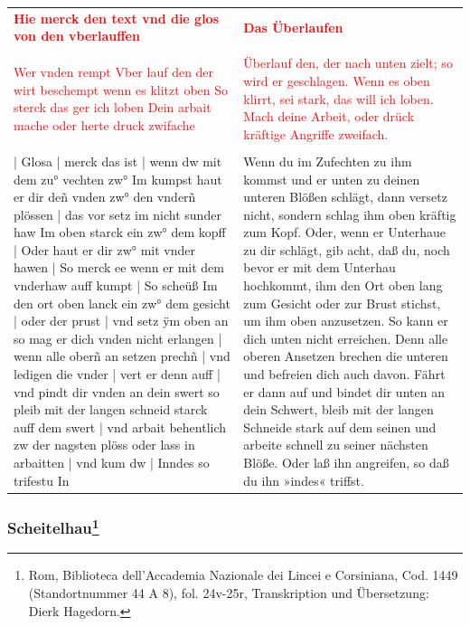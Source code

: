 \begin{longtable}{p{6.25cm}p{6.25cm}}
\textbf{\textcolor{red}{Hie merck den text vnd die glos von den vberlauffen}}
&
\textbf{\textcolor{red}{Das Überlaufen}}
\\
\\
\textcolor{red}{Wer vnden rempt Vber lauf den der wirt beschempt wenn es klitzt oben So sterck das ger ich loben Dein arbait mache oder herte druck zwifache}
&
\textcolor{red}{Überlauf den, der nach unten zielt; so wird er geschlagen. Wenn es oben klirrt, sei stark, das will ich loben. Mach deine Arbeit, oder drück kräftige Angriffe zweifach.}
\\
\\
| Glosa | merck das ist | wenn dw mit dem zu° vechten zw° Im kumpst haut er dir deñ vnden zw° den vnderñ plössen | das vor setz im nicht sunder haw Im oben starck ein zw° dem kopff | Oder haut er dir zw° mit vnder hawen | So merck ee wenn er mit dem vnderhaw auff kumpt | So scheüß Im den ort oben lanck ein zw° dem gesicht | oder der prust | vnd setz ÿm oben an so mag er dich vnden nicht erlangen | wenn alle oberñ an setzen prechñ | vnd ledigen die vnder | vert er denn auff | vnd pindt dir vnden an dein swert so pleib mit der langen schneid starck auff dem swert | vnd arbait behentlich zw der nagsten plöss oder lass in arbaitten | vnd kum dw | Inndes so trifestu In
&
Wenn du im Zufechten zu ihm kommst und er unten zu deinen unteren Blößen schlägt, dann versetz nicht, sondern schlag ihm oben kräftig zum Kopf. Oder, wenn er Unterhaue zu dir schlägt, gib acht, daß du, noch bevor er mit dem Unterhau hochkommt, ihm den Ort oben lang zum Gesicht oder zur Brust stichst, um ihm oben anzusetzen. So kann er dich unten nicht erreichen. Denn alle oberen Ansetzen brechen die unteren und befreien dich auch davon. Fährt er dann auf und bindet dir unten an dein Schwert, bleib mit der langen Schneide stark auf dem seinen und arbeite schnell zu seiner nächsten Blöße. Oder laß ihn angreifen, so daß du ihn »indes« triffst.
\end{longtable}

\newpage

\begin{center}
\end{center}

\newpage

\subsubsection[Scheitelhau]{Scheitelhau\footnote{\hspace*{0.5ex}Rom, Biblioteca dell'Accademia Nazionale dei Lincei e Corsiniana, Cod. 1449 (Standortnummer 44 A 8), fol. 24v-25r, Transkription und Übersetzung: Dierk Hagedorn.}}

